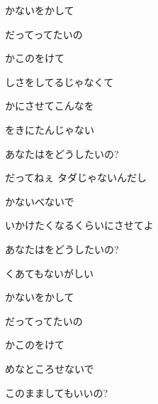 \documentclass[14pt]{ltjsarticle}
\begin{document}
{  かないをかして
  \jisho{}

  だってってたいの
  \jisho{}

  かこのをけて
  \jisho{}

\item
  しさをしてるじゃなくて
  \jisho{}

  かにさせてこんなを
  \jisho{}

\item
  をきにたんじゃない
  \jisho{}

  
あなたはをどうしたいの?
  \jisho{}

  だってねぇ タダじゃないんだし
  \jisho{}

  かないべないで
  \jisho{}

\item
  いかけたくなるくらいにさせてよ
  \jisho{}

  
あなたはをどうしたいの?
  \jisho{}

  くあてもないがしい
  \jisho{}

  かないをかして
  \jisho{}

  だってってたいの
  \jisho{}

  かこのをけて
  \jisho{}

\item
  めなところせないで
  \jisho{}

  
このまましてもいいの?
  \jisho{}

  
}
\end{document}

